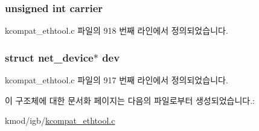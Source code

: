 \subsubsection[{\texorpdfstring{carrier}{carrier}}]{\setlength{\rightskip}{0pt plus 5cm}unsigned int carrier}\hypertarget{struct__kc__net__dev__ext_a71e65e92f87ac6542e37b13a98c8ebf2}{}\label{struct__kc__net__dev__ext_a71e65e92f87ac6542e37b13a98c8ebf2}


kcompat\+\_\+ethtool.\+c 파일의 918 번째 라인에서 정의되었습니다.

\subsubsection[{\texorpdfstring{dev}{dev}}]{\setlength{\rightskip}{0pt plus 5cm}struct net\+\_\+device$\ast$ dev}\hypertarget{struct__kc__net__dev__ext_abf690dbcccc005ba94a1ce16864ccdc9}{}\label{struct__kc__net__dev__ext_abf690dbcccc005ba94a1ce16864ccdc9}


kcompat\+\_\+ethtool.\+c 파일의 917 번째 라인에서 정의되었습니다.



이 구조체에 대한 문서화 페이지는 다음의 파일로부터 생성되었습니다.\+:\begin{DoxyCompactItemize}
\item 
kmod/igb/\hyperlink{kcompat__ethtool_8c}{kcompat\+\_\+ethtool.\+c}\end{DoxyCompactItemize}
